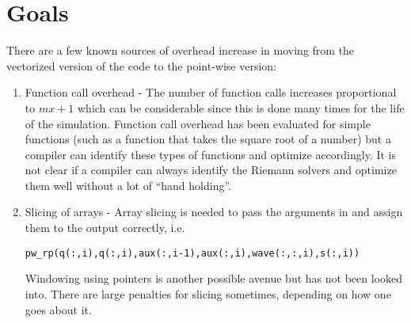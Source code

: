 \documentclass[]{article}
\begin{document}
\section{Goals}
There are a few known sources of overhead increase in moving from the vectorized version of the code to the point-wise version:
\begin{enumerate}
    \item Function call overhead - The number of function calls increases proportional to $mx+1$ which can be considerable since this is done many times for the life of the simulation.  Function call overhead has been evaluated for simple functions (such as a function that takes the square root of a number) but a compiler can identify these types of functions and optimize accordingly.  It is not clear if a compiler can always identify the Riemann solvers and optimize them well without a lot of ``hand holding''.
    \item Slicing of arrays - Array slicing is needed to pass the arguments in and assign them to the output correctly, i.e.
\begin{verbatim}
pw_rp(q(:,i),q(:,i),aux(:,i-1),aux(:,i),wave(:,:,i),s(:,i))
\end{verbatim}
    Windowing using pointers is another possible avenue but has not been looked into.  There are large penalties for slicing sometimes, depending on how one goes about it.
\end{enumerate}



\end{document}
